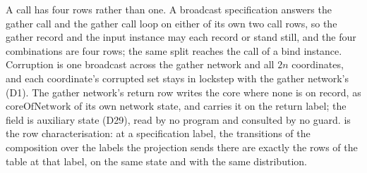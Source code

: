 \begin{definition}
  A call has four rows rather than one.
  A broadcast specification answers the gather call and the gather call loop on either of its own two call rows, so the gather record and the input instance may each record or stand still, and the four combinations are four rows; the same split reaches the call of a bind instance.
  Corruption is one broadcast across the gather network and all $2n$ coordinates, and each coordinate's corrupted set stays in lockstep with the gather network's (D1).
  The gather network's return row writes the core where none is on record, as $\mathrm{coreOfNetwork}$ of its own network state, and carries it on the return label; the field is auxiliary state (D29), read by no program and consulted by no guard.
   is the row characterisation: at a specification label, the transitions of the composition over the labels the projection sends there are exactly the rows of the table at that label, on the same state and with the same distribution.
\end{definition}
